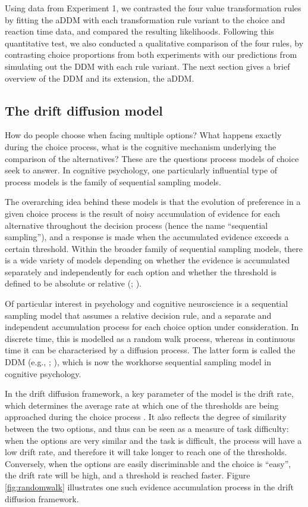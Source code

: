 \documentclass[11pt,a4paper]{article}
\begin{document}
Using data from Experiment 1, we contrasted the four value transformation rules by fitting the aDDM with each transformation rule variant to the choice and reaction time data, and compared the resulting likelihoods. Following this quantitative test, we also conducted a qualitative comparison of the four rules, by contrasting choice proportions from both experiments with our predictions from simulating out the DDM with each rule variant. The next section gives a brief overview of the DDM and its extension, the aDDM.



\subsection{The drift diffusion model} \label{chap1addmexplain}


How do people choose when facing multiple options? What happens exactly during the choice process, what is the cognitive mechanism underlying the comparison of the alternatives? These are the questions process models of choice seek to answer. In cognitive psychology, one particularly influential type of process models is the family of sequential sampling models. 

The overarching idea behind these models is that the evolution of preference in a given choice process is the result of noisy accumulation of evidence for each alternative throughout the decision process (hence the name “sequential sampling”), and a response is made when the accumulated evidence exceeds a certain threshold. Within the broader family of sequential sampling models, there is a wide variety of models depending on whether the evidence is accumulated separately and independently for each option and whether the threshold is defined to be absolute or relative (; ).

Of particular interest in psychology and cognitive neuroscience is a sequential sampling model that assumes a relative decision rule, and a separate and independent accumulation process for each choice option under consideration. In discrete time, this is modelled as a random walk process, whereas in continuous time it can be characterised by a diffusion process. The latter form is called the DDM (e.g., ; ), which is now the workhorse sequential sampling model in cognitive psychology. 

In the drift diffusion framework, a key parameter of the model is the drift rate, which determines the average rate at which one of the thresholds are being approached during the choice process \cite{Voss2004a}. It also reflects the degree of similarity between the two options, and thus can be seen as a measure of task difficulty: when the options are very similar and the task is difficult, the process will have a low drift rate, and therefore it will take longer to reach one of the thresholds. Conversely, when the options are easily discriminable and the choice is ``easy'', the drift rate will be high, and a threshold is reached faster. Figure \ref{fig:randomwalk} illustrates one such evidence accumulation process in the drift diffusion framework.
\end{document}

